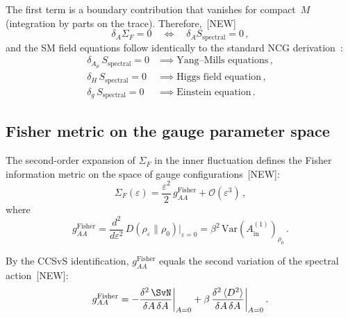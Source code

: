 The first term is a boundary contribution
that vanishes for compact~$M$
(integration by parts on the trace).
Therefore,~[NEW]
\begin{equation}\label{eq:equivalence}
  \delta_A \Sigma_F = 0
  \quad\Longleftrightarrow\quad
  \delta_A S_{\mathrm{spectral}} = 0\,,
\end{equation}
and the SM field equations follow
identically to the standard NCG
derivation~\cite{CC1996,CC2007,vS2024}:
\begin{align}
  \delta_{A_\mu}\, S_{\mathrm{spectral}} = 0
    &\implies \text{Yang--Mills equations}\,,
    \label{eq:YM}\\
  \delta_H\, S_{\mathrm{spectral}} = 0
    &\implies \text{Higgs field equation}\,,
    \label{eq:Higgs}\\
  \delta_g\, S_{\mathrm{spectral}} = 0
    &\implies \text{Einstein equation}\,.
    \label{eq:Einstein}
\end{align}


\subsection{Fisher metric on the gauge parameter space}
\label{sec:gauge_fisher}

The second-order expansion of $\Sigma_F$ in the
inner fluctuation defines the Fisher information
metric on the space of gauge
configurations~[NEW]:
\begin{equation}\label{eq:FisherF}
  \Sigma_F(\varepsilon)
  = \frac{\varepsilon^2}{2}\,
    g_{AA}^{\mathrm{Fisher}}
  + \mathcal{O}(\varepsilon^3)\,,
\end{equation}
where
\begin{equation}\label{eq:gAA}
  g_{AA}^{\mathrm{Fisher}}
  = \frac{d^2}{d\varepsilon^2}\,
    D(\rho_\varepsilon \| \rho_0)
    \Big|_{\varepsilon = 0}
  = \beta^2\,
    \mathrm{Var}(A_{\mathrm{in}}^{(1)})_{\rho_0}\,.
\end{equation}

By the CCSvS identification,
$g_{AA}^{\mathrm{Fisher}}$ equals the
second variation of the spectral
action~[NEW]:
\begin{equation}\label{eq:gAA_spectral}
  g_{AA}^{\mathrm{Fisher}}
  = -\frac{\delta^2\, \SvN}
    {\delta A\, \delta A}
    \bigg|_{A=0}
  + \beta\,
    \frac{\delta^2\,
    \langle D^2 \rangle}
    {\delta A\, \delta A}
    \bigg|_{A=0}\,.
\end{equation}

